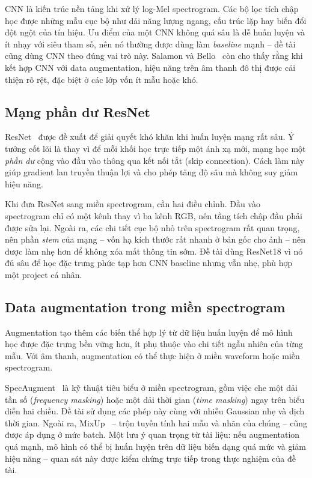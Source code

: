 CNN là kiến trúc nền tảng khi xử lý log-Mel spectrogram. Các bộ lọc tích chập học
được những mẫu cục bộ như dải năng lượng ngang, cấu trúc lặp hay biến đổi đột
ngột của tín hiệu. Ưu điểm của một CNN không quá sâu là dễ huấn luyện và ít nhạy
với siêu tham số, nên nó thường được dùng làm \textit{baseline} mạnh -- đề tài
cũng dùng CNN theo đúng vai trò này. Salamon và Bello~\cite{salamon2017} còn cho
thấy rằng khi kết hợp CNN với data augmentation, hiệu năng trên âm thanh đô thị
được cải thiện rõ rệt, đặc biệt ở các lớp vốn ít mẫu hoặc khó.

\subsection{Mạng phần dư ResNet}

ResNet~\cite{he2016} được đề xuất để giải quyết khó khăn khi huấn luyện mạng rất
sâu. Ý tưởng cốt lõi là thay vì để mỗi khối học trực tiếp một ánh xạ mới, mạng
học một \textit{phần dư} cộng vào đầu vào thông qua kết nối tắt (skip connection).
Cách làm này giúp gradient lan truyền thuận lợi và cho phép tăng độ sâu mà không
suy giảm hiệu năng.

Khi đưa ResNet sang miền spectrogram, cần hai điều chỉnh. Đầu vào spectrogram chỉ
có một kênh thay vì ba kênh RGB, nên tầng tích chập đầu phải được sửa lại. Ngoài
ra, các chi tiết cục bộ nhỏ trên spectrogram rất quan trọng, nên phần \textit{stem}
của mạng -- vốn hạ kích thước rất nhanh ở bản gốc cho ảnh -- nên được làm nhẹ hơn
để không xóa mất thông tin sớm. Đề tài dùng ResNet18 vì nó đủ sâu để học đặc
trưng phức tạp hơn CNN baseline nhưng vẫn nhẹ, phù hợp một project cá nhân.

\subsection{Data augmentation trong miền spectrogram}

Augmentation tạo thêm các biến thể hợp lý từ dữ liệu huấn luyện để mô hình học
được đặc trưng bền vững hơn, ít phụ thuộc vào chi tiết ngẫu nhiên của từng mẫu.
Với âm thanh, augmentation có thể thực hiện ở miền waveform hoặc miền spectrogram.

SpecAugment~\cite{park2019} là kỹ thuật tiêu biểu ở miền spectrogram, gồm việc
che một dải tần số (\textit{frequency masking}) hoặc một dải thời gian
(\textit{time masking}) ngay trên biểu diễn hai chiều. Đề tài sử dụng các phép
này cùng với nhiễu Gaussian nhẹ và dịch thời gian. Ngoài ra, MixUp~\cite{zhang2018}
-- trộn tuyến tính hai mẫu và nhãn của chúng -- cũng được áp dụng ở mức batch.
Một lưu ý quan trọng từ tài liệu: nếu augmentation quá mạnh, mô hình có thể bị
huấn luyện trên dữ liệu biến dạng quá mức và giảm hiệu năng -- quan sát này được
kiểm chứng trực tiếp trong thực nghiệm của đề tài.

